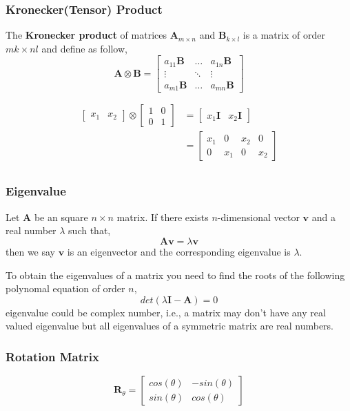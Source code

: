 \documentclass[12pt,aspectratio=169]{beamer}
\begin{document}
\begin{frame}
\frametitle{Kronecker(Tensor) Product}
The \textbf{Kronecker product} of matrices $\mathbf{A}_{m\times n}$ and $\mathbf{B}_{k\times l}$ is a matrix of order $mk\times nl$ and define as follow,
\[
\mathbf{A}\otimes \mathbf{B}=
\begin{bmatrix}
a_{11}\mathbf{B} & \dots & a_{1n}\mathbf{B}\\
\vdots & \ddots & \vdots\\
a_{m1}\mathbf{B} & \dots & a_{mn}\mathbf{B}
\end{bmatrix}
\]
\end{frame}

\begin{frame}
\[
\begin{aligned}
\begin{bmatrix}
x_1 & x_2
\end{bmatrix} \otimes
\begin{bmatrix}
1 & 0\\
0 & 1
\end{bmatrix}&=
\begin{bmatrix}
x_1 \mathbf{I} & x_2\mathbf{I}
\end{bmatrix}\\
&=
\begin{bmatrix}
x_1 & 0 & x_2 & 0\\
0 & x_1 & 0 & x_2 
\end{bmatrix}\\
\end{aligned}
\]
\end{frame}

\begin{frame}
\frametitle{Eigenvalue}
Let $\mathbf{A}$ be an square $n\times n$ matrix. If there exists $n$-dimensional vector $\mathbf{v}$ and a real number $\lambda$ such that,
\[
\mathbf{Av}=\lambda\mathbf{v}
\]
then we say $\mathbf{v}$ is an eigenvector and the corresponding eigenvalue is $\lambda$.
\end{frame}

\begin{frame}
To obtain the eigenvalues of a matrix you need to find the roots of the following polynomal equation of order $n$,\pause
\[
det(\lambda \mathbf{I}-\mathbf{A})=0
\] \pause
eigenvalue could be complex number, i.e., a matrix may don't have any real valued eigenvalue but \pause all eigenvalues of a symmetric matrix are real numbers.\end{frame}

\begin{frame}
\frametitle{Rotation Matrix}
\[
\mathbf{R}_{\theta}=
\begin{bmatrix}
cos(\theta) & -sin(\theta)\\
sin(\theta) & cos(\theta)
\end{bmatrix}
\]\pause
\begin{figure}
\end{figure}
\end{frame}
\end{document}
